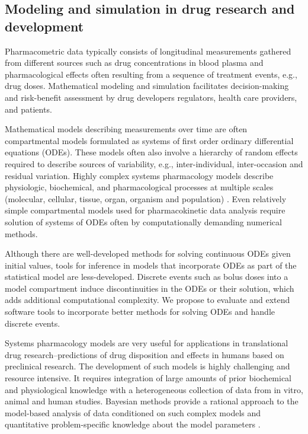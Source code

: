 \subsection{Modeling and simulation in drug research and development}

Pharmacometric data typically consists of longitudinal measurements
gathered from different sources such as drug concentrations in blood
plasma and pharmacological effects often resulting from a sequence of
treatment events, e.g., drug doses. Mathematical modeling and
simulation facilitates decision-making and risk-benefit assessment by
drug developers regulators, health care providers, and patients.

Mathematical models describing measurements over time are often
compartmental models formulated as systems of first order ordinary
differential equations (ODEs). These models often also involve a
hierarchy of random effects required to describe sources of
variability, e.g., inter-individual, inter-occasion and residual
variation. Highly complex systems pharmacology models describe
physiologic, biochemical, and pharmacological processes at multiple
scales (molecular, cellular, tissue, organ, organism and population)
\citep[e.g.,][]{baron-et-al:2013, peterson-rigg:2010}. Even relatively
simple compartmental models used for pharmacokinetic data analysis
require solution of systems of ODEs often by computationally demanding
numerical methods.

Although there are well-developed methods for solving continuous ODEs
given initial values, tools for inference in models that incorporate
ODEs as part of the statistical model are less-developed. Discrete
events such as bolus doses into a model compartment induce
discontinuities in the ODEs or their solution, which adds additional
computational complexity. We propose to evaluate and extend software
tools to incorporate better methods for solving ODEs and handle
discrete events.

Systems pharmacology models are very useful for applications in
translational drug research--predictions of drug disposition and
effects in humans based on preclinical research. The development of
such models is highly challenging and resource intensive. It requires
integration of large amounts of prior biochemical and physiological
knowledge with a heterogeneous collection of data from in vitro,
animal and human studies. Bayesian methods provide a rational approach
to the model-based analysis of data conditioned on such complex models
and quantitative problem-specific knowledge about the model parameters
\citep[e.g.,][]{gelman-et-al:1996, leclerc-et-al:2016}.

